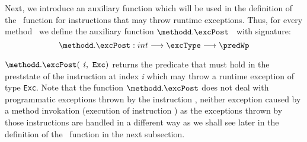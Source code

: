 Next, we introduce an auxiliary function which will be used in the definition of the \fwpi \ function for instructions
that may throw runtime exceptions.
Thus, for every method \methodd \  we define  the auxiliary function $ \methodd.\excPost $ \ with signature:
$$\methodd.\excPost : int   \longrightarrow \excType \longrightarrow  \predWp  $$
 
$ \methodd.\excPost(\mbox{ \rm \textit{i}},  \mbox{ \rm \texttt{Exc}})$ 
returns the predicate that must hold in the preststate of the instruction at index \textit{i}  which may throw a runtime exception of type \texttt{Exc}.
Note that the function $\methodd.\excPost$  does not deal with programmatic exceptions thrown by the instruction \athrow,
 neither exception caused by a method invokation
(execution of instruction \invoke) as the exceptions thrown by those instructions are handled in a different way as we
 shall see later in the definition of the \fwpi \ function in the next subsection.  




